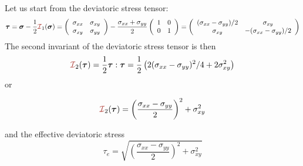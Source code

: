 Let us start from the deviatoric stress tensor:
\[
\bm\tau
=
\bm\sigma - \frac12 {\III}_1(\bm\sigma)
=
\left(\begin{array}{cc}
\sigma_{xx} & \sigma_{xy} \\ 
\sigma_{xy} & \sigma_{yy} 
\end{array}\right)
-\frac{\sigma_{xx}+\sigma_{yy}}{2} 
\left(\begin{array}{cc}
1 & 0 \\ 0 & 1
\end{array}\right)
=
\left(
\begin{array}{cc}
(\sigma_{xx}-\sigma_{yy})/2 & \sigma_{xy} \\
\sigma_{xy} & -(\sigma_{xx}-\sigma_{yy})/2
\end{array}
\right)
\]
The second invariant of the deviatoric stress tensor is then 
\[
{\III}_2(\bm\tau) = \frac12 \bm\tau:\bm\tau
= \frac12 \left( 2 (\sigma_{xx}-\sigma_{yy})^2/4 + 2 \sigma_{xy}^2 \right)
\]
or
\begin{mdframed}[backgroundcolor=blue!5]
\[
{\III}_2(\bm\tau) 
= \left(\frac{\sigma_{xx}-\sigma_{yy}}{2} \right)^2 + \sigma_{xy}^2
\]
\end{mdframed}


and the effective deviatoric stress
\[
\tau_e = 
\sqrt{\left(\frac{\sigma_{xx}-\sigma_{yy}}{2} \right)^2 + \sigma_{xy}^2}
\]


